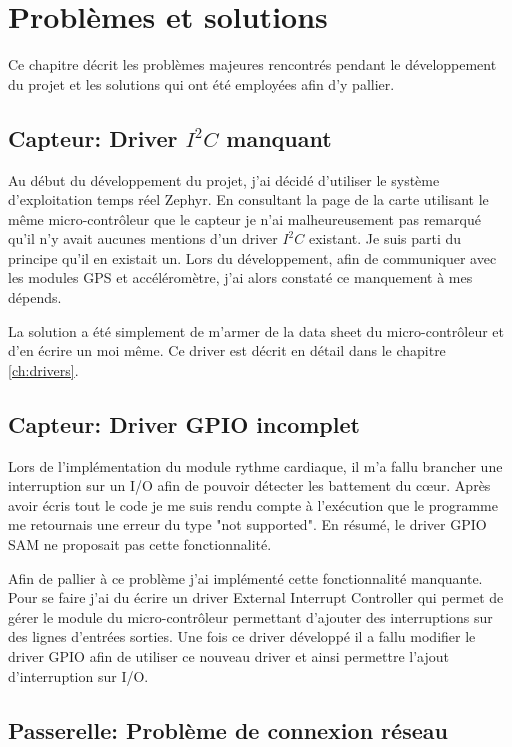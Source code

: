 
\chapter{Problèmes et solutions}\label{ch:prob_solutions}

Ce chapitre décrit les problèmes majeures rencontrés pendant le développement du projet et les solutions qui ont été employées afin d'y pallier.

\section{Capteur: Driver $I^{2}C$ manquant}

Au début du développement du projet, j'ai décidé d'utiliser le système d'exploitation temps réel Zephyr. En consultant la page de la carte utilisant le même micro-contrôleur que le capteur je n'ai malheureusement pas remarqué qu'il n'y avait aucunes mentions d'un driver $I^{2}C$ existant. Je suis parti du principe qu'il en existait un. Lors du développement, afin de communiquer avec les modules GPS et accéléromètre, j'ai alors constaté ce manquement à mes dépends.

La solution a été simplement de m'armer de la data sheet du micro-contrôleur et d'en écrire un moi même. Ce driver est décrit en détail dans le chapitre \ref{ch:drivers}.

\section{Capteur: Driver GPIO incomplet}

Lors de l'implémentation du module rythme cardiaque, il m'a fallu brancher une interruption sur un I/O afin de pouvoir détecter les battement du cœur. Après avoir écris tout le code je me suis rendu compte à l'exécution que le programme me retournais une erreur du type "not supported". En résumé, le driver GPIO SAM ne proposait pas cette fonctionnalité.

Afin de pallier à ce problème j'ai implémenté cette fonctionnalité manquante. Pour se faire j'ai du écrire un driver External Interrupt Controller qui permet de gérer le module du micro-contrôleur permettant d'ajouter des interruptions sur des lignes d'entrées sorties. Une fois ce driver développé il a fallu modifier le driver GPIO afin de utiliser ce nouveau driver et ainsi permettre l'ajout d'interruption sur I/O.

\section{Passerelle: Problème de connexion réseau}

